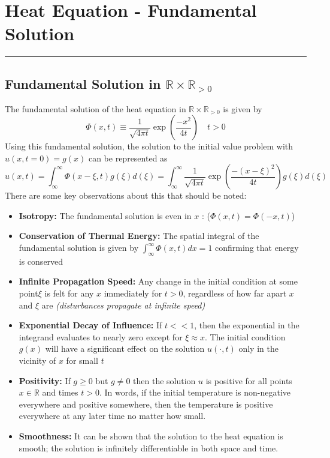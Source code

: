 \documentclass[11pt]{article}
\newcommand{\R}{\mathbb{R}}
\begin{document}
\pagebreak

\section{Heat Equation - Fundamental Solution}
\hrule \vspace{15pt}

\subsection{Fundamental Solution in $\R \times \R_{>0}$}
The fundamental solution of the heat equation in $\R \times \R_{>0}$ is given by
$$ \Phi(x,t) \equiv  \frac{1}{\sqrt{4\pi t}} \exp \left( \frac{-x^2}{4t} \right) \quad t>0$$ Using this fundamental solution, the solution to the initial value problem with $u(x, t = 0) = g(x)$ can be represented as
$$u(x,t) = \int_{\infty}^{\infty}  \Phi(x - \xi, t) g(\xi) d(\xi) = \int_{\infty}^{\infty}  \frac{1}{\sqrt{4\pi t}} \exp \left( \frac{-(x-\xi)^2}{4t} \right) g(\xi) d(\xi)$$
There are some key observations about this that should be noted:
\begin{itemize}
\item \textbf{Isotropy:} The fundamental solution is even in $x$ : ($ \Phi (x, t) = \Phi (-x, t)$)
\item \textbf{Conservation of Thermal Energy:} The spatial integral of the fundamental solution is given by $ \int_{\infty}^{\infty} \Phi (x, t) dx = 1$ confirming that energy is conserved
\item \textbf{Infinite Propagation Speed:} Any change in the initial condition at some point$\xi$ is felt for any $x$ immediately for $t > 0$, regardless of how far apart $x$ and $\xi$ are \textit{(disturbances propagate at infinite speed)}
\item \textbf{Exponential Decay of Influence:} If $t << 1$, then the exponential in the integrand evaluates to nearly zero except for $\xi \approx x$. The initial condition $g(x)$ will have a significant effect on the solution $u(\cdot , t)$ only in the vicinity of $x$ for small $t$
\item \textbf{Positivity:} If $g \geq 0$ but $g\neq 0$ then the solution $u$ is positive for all points $x \in \R$ and times $t > 0$. In words, if the initial temperature is non-negative everywhere and positive somewhere, then the temperature is positive everywhere at any later time no matter how small.
\item \textbf{Smoothness:} It can be shown that the solution to the heat equation is smooth; the solution is infinitely differentiable in both space and time.
\end{itemize}
\end{document}
